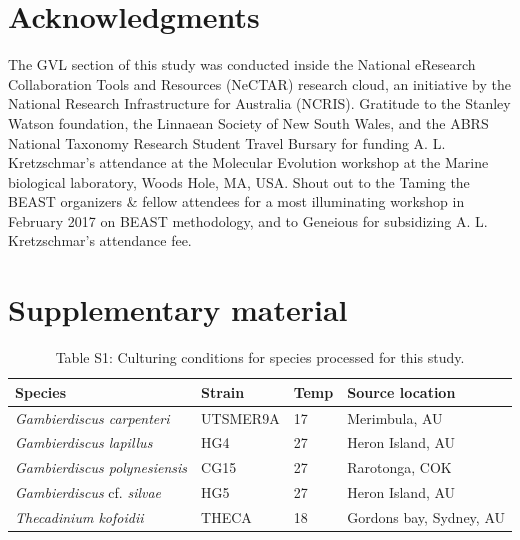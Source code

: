 \documentclass[12pt]{article}
\begin{document}
\section{Acknowledgments}
The GVL section of this study was conducted inside the National eResearch Collaboration Tools and Resources (NeCTAR) research cloud, an initiative by the National Research Infrastructure for Australia (NCRIS).
Gratitude to the Stanley Watson foundation, the Linnaean Society of New South Wales, and the ABRS National Taxonomy Research Student Travel Bursary for funding A. L. Kretzschmar's attendance at the Molecular Evolution workshop at the Marine biological laboratory, Woods Hole, MA, USA.
Shout out to the Taming the BEAST organizers \& fellow attendees for a most illuminating workshop in February 2017 on BEAST methodology, and to Geneious for subsidizing A. L. Kretzschmar's attendance fee.
\section{Supplementary material}
\FloatBarrier
\begin{table}
\caption{Table S1: Culturing conditions for species processed for this study.}
\begin{tabular}{ | p{3cm} | p{2.5cm} | p{1.5cm} | p{5.3cm} |}
\hline
\textbf{Species} & \textbf{Strain}& \textbf{Temp} & \textbf{Source location} \\
\hline
\textit{Gambierdiscus carpenteri}&UTSMER9A&17&Merimbula, AU\\
\hline
\textit{Gambierdiscus lapillus}&HG4&27&Heron Island, AU\\
\hline
\textit{Gambierdiscus polynesiensis}&CG15&27&Rarotonga, COK\\
\hline
\textit{Gambierdiscus} cf. \textit{silvae}&HG5&27&Heron Island, AU\\
\hline
\textit{Thecadinium kofoidii}&THECA&18&Gordons bay, Sydney, AU\\
\hline
\end{tabular}
\end{table}
\FloatBarrier
\end{document}
